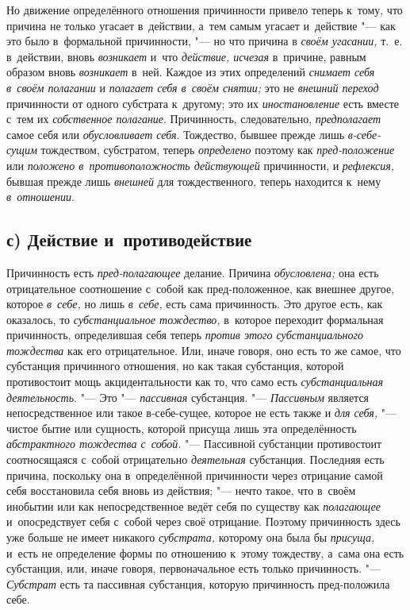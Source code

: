 Но движение определённого отношения причинности привело теперь к~тому, что
причина не только угасает в~действии, а~тем самым угасает и~действие "--- как
это было в~формальной причинности, "--- но что причина в {\em своём угасании,}
т.~е. в~действии, вновь {\em возникает} и~что {\em действие, исчезая}
в~причине, равным образом вновь {\em возникает} в~ней. Каждое из этих определений
{\em снимает себя в~своём полагании} и {\em полагает себя в~своём снятии;} это
не {\em внешний переход} причинности от одного субстрата к~другому; это их
{\em иностановление} есть вместе с~тем их {\em собственное полагание}.
Причинность, следовательно, {\em предполагает} самое себя или
{\em обусловливает себя}. Тождество, бывшее прежде лишь {\em в-себе-сущим}
тождеством, субстратом, теперь {\em определено} поэтому как
{\em пред-положение} или {\em положено в~противоположность действующей}
причинности, и {\em рефлексия,} бывшая прежде лишь {\em внешней} для
тождественного, теперь находится к~нему {\em в~отношении}.

\subsection[с) Действие и~противодействие]{с) Действие и~противодействие}

Причинность есть {\em пред-полагающее} делание. Причина {\em обусловлена;} она
есть отрицательное соотношение с~собой как пред-положенное, как внешнее другое,
которое {\em в~себе,} но лишь {\em в~себе,} есть сама причинность. Это другое
есть, как оказалось, то {\em субстанциальное тождество,} в~которое переходит
формальная причинность, определившая себя теперь {\em против этого
субстанциального тождества} как его отрицательное. Или, иначе говоря, оно есть
то же самое, что субстанция причинного отношения, но как такая субстанция,
которой противостоит мощь акцидентальности как то, что само есть
{\em субстанциальная деятельность}. "--- Это "--- {\em пассивная} субстанция.
"--- {\em Пассивным} является непосредственное или такое в-себе-сущее, которое
не есть также и {\em для себя,} "--- чистое бытие или сущность, которой присуща
лишь эта определённость {\em абстрактного тождества с~собой}. "--- Пассивной
субстанции противостоит соотносящаяся с~собой отрицательно {\em деятельная}
субстанция. Последняя есть причина, поскольку она в~определённой причинности
через отрицание самой себя восстановила себя вновь из действия; "--- нечто
такое, что в~своём инобытии или как непосредственное ведёт себя по существу как
{\em полагающее} и~опосредствует себя с~собой через своё отрицание. Поэтому
причинность здесь уже больше не имеет никакого {\em субстрата,} которому она
была бы {\em присуща,} и~есть не определение формы по отношению к~этому
тождеству, а~сама она есть субстанция, или, иначе говоря, первоначальное есть
только причинность. "--- {\em Субстрат} есть та пассивная субстанция, которую
причинность пред-положила себе.

